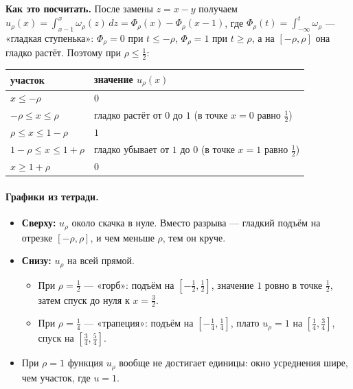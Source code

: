 \begin{idea}
\textbf{Как это посчитать.} После замены $z = x - y$ получаем
$u_\rho(x) = \int_{x-1}^{x} \omega_\rho(z)\,dz = \Phi_\rho(x) - \Phi_\rho(x-1)$, где
$\Phi_\rho(t) = \int_{-\infty}^t \omega_\rho$ — «гладкая ступенька»: $\Phi_\rho = 0$
при $t \le -\rho$, $\Phi_\rho = 1$ при $t \ge \rho$, а на $[-\rho, \rho]$ она гладко растёт.
Поэтому при $\rho \le \tfrac12$:

\medskip
\begin{center}
\begin{tabular}{ll}
\toprule
участок & значение $u_\rho(x)$ \\
\midrule
$x \le -\rho$ & $0$ \\
$-\rho \le x \le \rho$ & гладко растёт от $0$ до $1$ (в точке $x=0$ равно $\tfrac12$) \\
$\rho \le x \le 1-\rho$ & $1$ \\
$1-\rho \le x \le 1+\rho$ & гладко убывает от $1$ до $0$ (в точке $x = 1$ равно $\tfrac12$) \\
$x \ge 1+\rho$ & $0$ \\
\bottomrule
\end{tabular}
\end{center}
\end{idea}


\paragraph{Графики из тетради.}
\begin{itemize}
  \item \textbf{Сверху:} $u_\rho$ около скачка в нуле. Вместо разрыва — гладкий подъём
        на отрезке $[-\rho, \rho]$, и чем меньше $\rho$, тем он круче.
  \item \textbf{Снизу:} $u_\rho$ на всей прямой.
        \begin{itemize}
          \item При $\rho = \tfrac12$ — «горб»: подъём на $[-\tfrac12, \tfrac12]$, значение
                $1$ ровно в точке $\tfrac12$, затем спуск до нуля к $x = \tfrac32$.
          \item При $\rho = \tfrac14$ — «трапеция»: подъём на $[-\tfrac14, \tfrac14]$,
                плато $u_\rho = 1$ на $[\tfrac14, \tfrac34]$, спуск на $[\tfrac34, \tfrac54]$.
        \end{itemize}
  \item При $\rho = 1$ функция $u_\rho$ вообще не достигает единицы: окно усреднения шире,
        чем участок, где $u = 1$.
\end{itemize}

